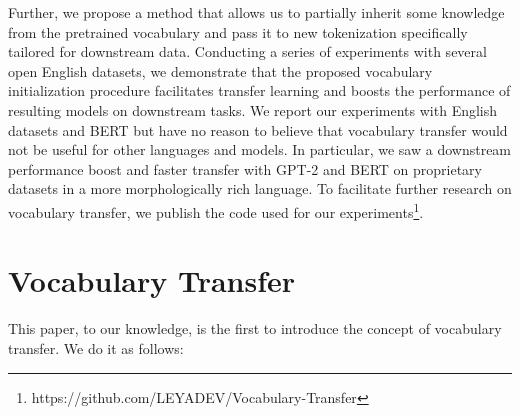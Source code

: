 \documentclass[review]{elsarticle}
\begin{document}
Further, we propose a method that allows us to partially inherit some knowledge from the pretrained vocabulary and pass it to new tokenization specifically tailored for downstream data. Conducting a series of experiments with several open English datasets, we demonstrate that the proposed vocabulary initialization procedure facilitates transfer learning and boosts the performance of resulting models on downstream tasks. We report our experiments with English datasets and BERT but have no reason to believe that vocabulary transfer would not be useful for other languages and models. In particular, we saw a downstream performance boost and faster transfer with GPT-2 and BERT on proprietary datasets in a more morphologically rich language. To facilitate further research on vocabulary transfer, we publish the code used for our experiments\footnote{https://github.com/LEYADEV/Vocabulary-Transfer}.


\section{Vocabulary Transfer}
\label{sec:voc}

This paper, to our knowledge, is the first to introduce the concept of vocabulary transfer. We do it as follows:
\end{document}
